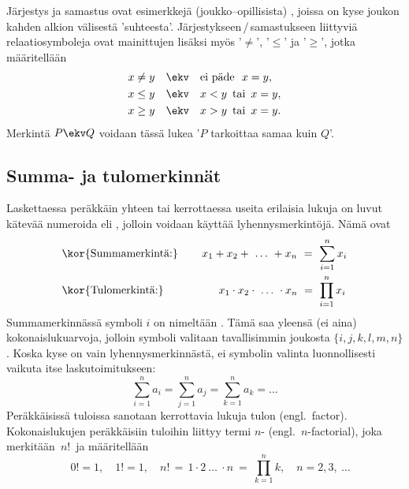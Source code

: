 %
Järjestys ja samastus ovat esimerkkejä (joukko--opillisista) , joissa on kyse
joukon kahden alkion välisestä 'suhteesta'. Järjestykseen\,/\,samastukseen liittyviä
relaatiosymboleja ovat mainittujen lisäksi myös '$\neq$', '$\le$' ja '$\ge$', jotka määritellään
\begin{align*}
x \neq y \quad &\ekv \quad \text{ei päde}\ \ x=y, \\
x \le y  \quad &\ekv \quad x < y\,\ \text{tai}\,\ x = y, \\
x \ge y  \quad &\ekv \quad x > y\,\ \text{tai}\,\ x = y.
\end{align*}
Merkintä $P \ekv Q$ voidaan tässä lukea '$P$ tarkoittaa samaa kuin $Q$'.

\subsection{Summa- ja tulomerkinnät}

Laskettaessa peräkkäin yhteen tai kerrottaessa useita erilaisia lukuja on luvut kätevää 
numeroida eli , jolloin voidaan käyttää lyhennysmerkintöjä. Nämä ovat 
\begin{align*}
&\text{\kor{Summamerkintä:}} \qquad\, x_1 + x_2 + \ \ldots\  + x_n\ =\ \sum_{i=1}^n x_i \\
&\text{\kor{Tulomerkintä:}} \qquad\qquad\quad x_1 \cdot x_2 \cdot\ \ldots\ \cdot x_n\ 
                                                                    =\ \prod_{i=1}^n x_i
\end{align*}
%
Summamerkinnässä symboli $i$ on nimeltään . Tämä saa yleensä (ei aina)
kokonaislukuarvoja, jolloin symboli valitaan tavallisimmin joukosta $\{i,j,k,l,m,n\}$.
Koska kyse on vain lyhennysmerkinnästä, ei symbolin valinta luonnollisesti vaikuta itse 
laskutoimitukseen:
\[
\sum_{i=1}^n a_i = \sum_{j=1}^n a_j = \sum_{k=1}^n a_k = \ldots
\]
Peräkkäisissä tuloissa sanotaan kerrottavia lukuja tulon  (engl.\ factor).
Kokonaislukujen peräkkäisiin tuloihin liittyy termi 
$n$- (engl.\ $n$-factorial),
joka merkitään $\,n!\,$ ja määritellään
\[
\quad 0! = 1, \quad 1! = 1, \quad n!\,=\,1 \cdot 2 \ \ldots\ \cdot n\ 
                                      =\ \prod_{k=1}^n k, \quad n = 2,3,\ \ldots
\]


